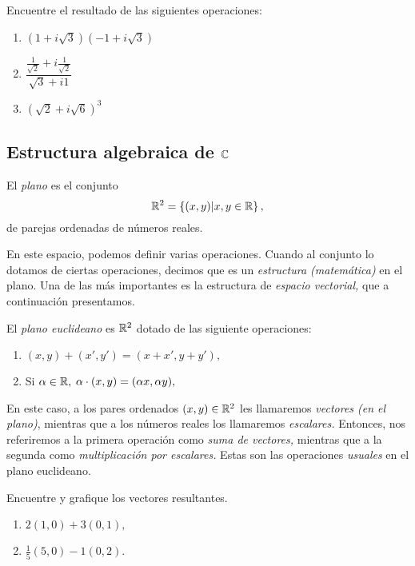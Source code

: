 \begin{problema}
\label{exe:1.1.1}
 Encuentre el resultado de las siguientes operaciones:
 \begin{enumerate}
  \item $\left( 1+i\sqrt{3} \right)\left( -1 +i\sqrt{3} \right)$
  \item $\dfrac{\frac{1}{\sqrt{2}}+i\frac{1}{\sqrt{2}}}{\sqrt{3}+i1}$
  \item $\left( \sqrt{2}+i\sqrt{6} \right)^{3}$
 \end{enumerate}

\end{problema}

\subsection{Estructura algebraica de $\mathbb{C}$}

\begin{defn}El \emph{plano} es el conjunto
	$$
	\mathbb{R}^{2}=\left\{ (x,y)|x,y\in \mathbb{R}  \right\},
	$$
	de parejas ordenadas de números reales.
\end{defn}

En este espacio, podemos definir varias operaciones. Cuando al conjunto lo dotamos de ciertas operaciones, decimos que
es un \emph{estructura (matemática)} en el plano. Una de las más importantes es la estructura de \emph{espacio
	vectorial,} que a continuación presentamos.

\begin{defn} El \emph{plano euclideano} es $\mathbb{R}^{2}$ dotado de las siguiente operaciones:
	\begin{enumerate}
		\item 
		$
		(x,y)+(x',y')=(x+x',y+y'),
		$
		\item Si $\alpha \in \mathbb{R},$
		$
		\alpha\cdot(x,y)=(\alpha x,\alpha y),
		$
	\end{enumerate}
\end{defn}

\begin{rem}
	En este caso, a los pares ordenados $(x,y)\in \mathbb{R}^{2}$ les llamaremos \emph{vectores (en el plano)}, mientras que a los
	números reales los llamaremos \emph{escalares.} Entonces, nos referiremos a la primera operación como \emph{suma de
		vectores,} mientras que a la segunda como \emph{multiplicación por escalares.} Estas son las operaciones \emph{usuales}
	en el plano euclideano.
\end{rem}


\begin{problema}
	Encuentre y grafique los vectores resultantes.
	\begin{enumerate}
		\item $2(1,0)+3(0,1),$
		\item $\frac{1}{5}(5,0)-1(0,2).$
	\end{enumerate}
	
\end{problema}

